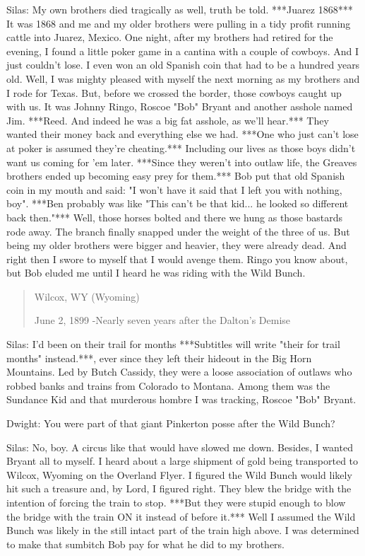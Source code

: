 \documentclass{article}
\begin{document}
Silas: My own brothers died tragically as well, truth be told. ***Juarez 1868*** It was 1868 and me and my older brothers were pulling in a tidy profit running cattle into Juarez, Mexico. One night, after my brothers had retired for the evening, I found a little poker game in a cantina with a couple of cowboys. And I just couldn't lose. I even won an old Spanish coin that had to be a hundred years old. Well, I was mighty pleased with myself the next morning as my brothers and I rode for Texas. But, before we crossed the border, those cowboys caught up with us. It was Johnny Ringo, Roscoe "Bob" Bryant and another asshole named Jim. ***Reed. And indeed he was a big fat asshole, as we'll hear.*** They wanted their money back and everything else we had. ***One who just can't lose at poker is assumed they're cheating.*** Including our lives as those boys didn't want us coming for 'em later. ***Since they weren't into outlaw life, the Greaves brothers ended up becoming easy prey for them.*** Bob put that old Spanish coin in my mouth and said: "I won't have it said that I left you with nothing, boy". ***Ben probably was like "This can't be that kid... he looked so different back then."*** Well, those horses bolted and there we hung as those bastards rode away. The branch finally snapped under the weight of the three of us. But being my older brothers were bigger and heavier, they were already dead. And right then I swore to myself that I would avenge them. Ringo you know about, but Bob eluded me until I heard he was riding with the Wild Bunch.

\begin{quote}
    Wilcox, WY (Wyoming)
    
    June 2, 1899 -Nearly seven years after the Dalton's Demise
\end{quote}

Silas: I'd been on their trail for months ***Subtitles will write "their for trail months" instead.***, ever since they left their hideout in the Big Horn Mountains. Led by Butch Cassidy, they were a loose association of outlaws who robbed banks and trains from Colorado to Montana. Among them was the Sundance Kid and that murderous hombre I was tracking, Roscoe "Bob" Bryant.

Dwight: You were part of that giant Pinkerton posse after the Wild Bunch?

Silas: No, boy. A circus like that would have slowed me down. Besides, I wanted Bryant all to myself. I heard about a large shipment of gold being transported to Wilcox, Wyoming on the Overland Flyer. I figured the Wild Bunch would likely hit such a treasure and, by Lord, I figured right. They blew the bridge with the intention of forcing the train to stop. ***But they were stupid enough to blow the bridge with the train ON it instead of before it.*** Well I assumed the Wild Bunch was likely in the still intact part of the train high above. I was determined to make that sumbitch Bob pay for what he did to my brothers. 
\end{document}
